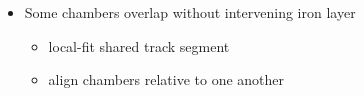 \documentclass[compress]{beamer}
\begin{document}
\begin{frame}
\begin{columns}
\begin{itemize}
\begin{itemize}
\end{itemize}

\end{itemize}
\end{columns}

\vspace{-0.3 cm}
\begin{columns}
\begin{itemize}
\item<3> Some chambers overlap without intervening iron layer
\begin{itemize}
\item local-fit shared track segment
\item align chambers relative to one another
\end{itemize}
\end{itemize}


\end{columns}
\end{frame}
\end{document}
